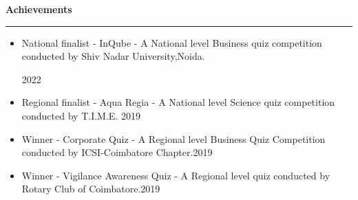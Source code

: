 \documentclass{article}
\begin{document}

\vspace*{1cm}
\fontsize{15}{14}
\faCertificate\vspace*{0.1cm}\textbf{\Large{Achievements}}\par
\rule{\linewidth}{0.5pt}
\fontsize{10}{14}
\begin{itemize}
    \item National finalist - InQube - A National level Business quiz competition conducted by Shiv Nadar University,Noida. \par\hfill\fontsize{8}{14}2022
    \item Regional finalist - Aqua Regia - A National level Science quiz competition conducted by T.I.M.E. \hfill\fontsize{8}{14}2019
    \item Winner - Corporate Quiz - A Regional level Business Quiz Competition conducted by ICSI-Coimbatore Chapter.\hfill\fontsize{8}{14}2019
    \item Winner - Vigilance Awareness Quiz - A Regional level quiz conducted by Rotary Club of Coimbatore.\hfill\fontsize{8}{14}2019
\end{itemize}
\end{document}
